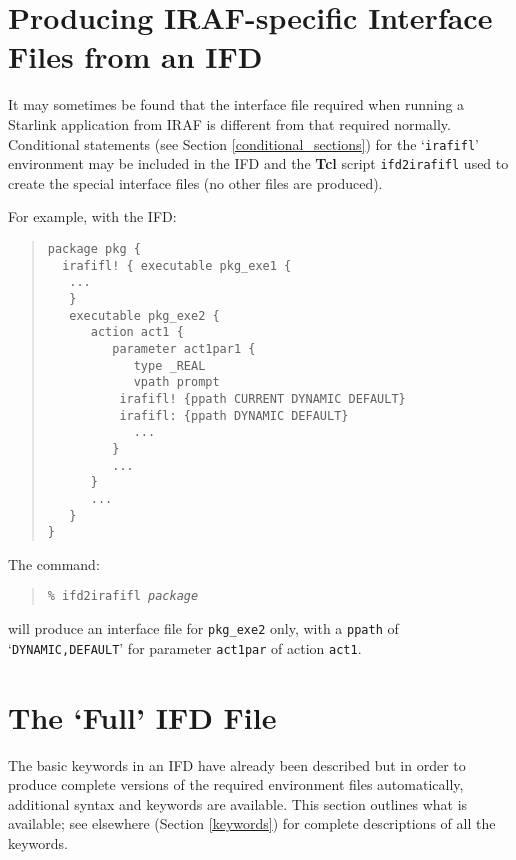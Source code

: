\documentclass[twoside,11pt]{article}
\newcommand{\htmlref}[2]{#1}
\newcommand{\xlabel}[1]{}
\newcommand{\latex}[1]{#1}
\begin{document}
\section{\label{ifd2irafifl}\xlabel{producing_irafspecific_interface_files_from_an_ifd}Producing 
IRAF-specific Interface Files from an IFD}
It may sometimes be found that the interface file required when running a
Starlink application from IRAF is different from that required normally.
\htmlref{Conditional statements}{conditional_sections}\latex{ (see Section
\ref{conditional_sections})} for the `\texttt{irafifl}' environment may be 
included in the IFD and the \textbf{Tcl} script \texttt{ifd2irafifl} used to 
create the special interface files (no other files are produced).

For example, with the IFD:
\begin{quote} \begin{verbatim}
package pkg {
  irafifl! { executable pkg_exe1 {
   ...
   }
   executable pkg_exe2 {
      action act1 {
         parameter act1par1 {
            type _REAL
            vpath prompt
          irafifl! {ppath CURRENT DYNAMIC DEFAULT}
          irafifl: {ppath DYNAMIC DEFAULT}
            ...
         }
         ...
      }
      ...
   }
}
\end{verbatim} \end{quote}
The command:
\begin{quote} 
\texttt{\% ifd2irafifl \textit{package}}
\end{quote}
will produce an interface file for \texttt{pkg\_exe2} only, with a 
\texttt{ppath} of `\texttt{DYNAMIC,DEFAULT}' for parameter \texttt{act1par} of 
action \texttt{act1}.

\section{\xlabel{the_full_ifd_file}\label{IFD_file}The `Full' IFD File}
The basic keywords in an IFD have already been described but in order to 
produce complete versions of the required environment files automatically, 
additional syntax and keywords are available.
This section outlines what is available; see elsewhere
\latex{(Section \ref{keywords}) } for 
\htmlref{complete descriptions}{keywords} of all the keywords.
\end{document}
